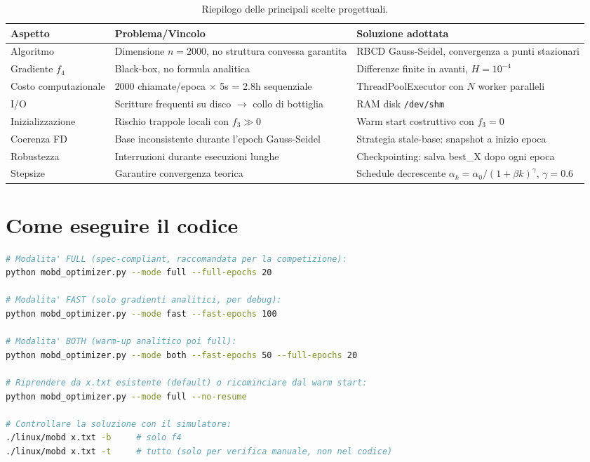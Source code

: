 \documentclass[12pt,a4paper]{article}
\theoremstyle{definition}
\begin{document}
\begin{table}[h]
\centering
\renewcommand{\arraystretch}{1.4}
\begin{tabular}{@{}p{}p{}p{}@{}}
\toprule
\textbf{Aspetto} & \textbf{Problema/Vincolo} & \textbf{Soluzione adottata} \\
\midrule
Algoritmo & Dimensione $n=2000$, no struttura convessa garantita &
  RBCD Gauss-Seidel, convergenza a punti stazionari \\
Gradiente $f_4$ & Black-box, no formula analitica &
  Differenze finite in avanti, $H=10^{-4}$ \\
Costo computazionale & 2000 chiamate/epoca $\times$ 5s = 2.8h sequenziale &
  ThreadPoolExecutor con $N$ worker paralleli \\
I/O & Scritture frequenti su disco $\to$ collo di bottiglia &
  RAM disk \texttt{/dev/shm} \\
Inizializzazione & Rischio trappole locali con $f_3 \gg 0$ &
  Warm start costruttivo con $f_3=0$ \\
Coerenza FD & Base inconsistente durante l'epoch Gauss-Seidel &
  Strategia stale-base: snapshot a inizio epoca \\
Robustezza & Interruzioni durante esecuzioni lunghe &
  Checkpointing: salva best\_X dopo ogni epoca \\
Stepsize & Garantire convergenza teorica &
  Schedule decrescente $\alpha_k = \alpha_0/(1+\beta k)^\gamma$, $\gamma=0.6$ \\
\bottomrule
\end{tabular}
\caption{Riepilogo delle principali scelte progettuali.}
\end{table}

\section{Come eseguire il codice}

\begin{lstlisting}[language=bash, caption={Comandi di esecuzione}]
# Modalita' FULL (spec-compliant, raccomandata per la competizione):
python mobd_optimizer.py --mode full --full-epochs 20

# Modalita' FAST (solo gradienti analitici, per debug):
python mobd_optimizer.py --mode fast --fast-epochs 100

# Modalita' BOTH (warm-up analitico poi full):
python mobd_optimizer.py --mode both --fast-epochs 50 --full-epochs 20

# Riprendere da x.txt esistente (default) o ricominciare dal warm start:
python mobd_optimizer.py --mode full --no-resume

# Controllare la soluzione con il simulatore:
./linux/mobd x.txt -b     # solo f4
./linux/mobd x.txt -t     # tutto (solo per verifica manuale, non nel codice)
\end{lstlisting}
\end{document}
